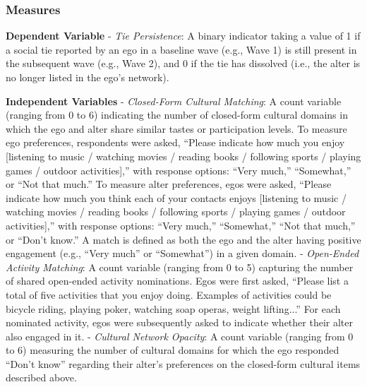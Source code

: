 \subsubsection{Measures}\label{measures}

\textbf{Dependent Variable} - \emph{Tie Persistence}: A binary indicator
taking a value of 1 if a social tie reported by an ego in a baseline
wave (e.g., Wave 1) is still present in the subsequent wave (e.g., Wave
2), and 0 if the tie has dissolved (i.e., the alter is no longer listed
in the ego's network).

\textbf{Independent Variables} - \emph{Closed-Form Cultural Matching}: A
count variable (ranging from 0 to 6) indicating the number of
closed-form cultural domains in which the ego and alter share similar
tastes or participation levels. To measure ego preferences, respondents were asked, ``Please indicate how much you enjoy [listening to music / watching movies / reading books / following sports / playing games / outdoor activities],'' with response options: ``Very much,'' ``Somewhat,'' or ``Not that much.'' To measure alter preferences, egos were asked, ``Please indicate how much you think each of your contacts enjoys [listening to music / watching movies / reading books / following sports / playing games / outdoor activities],'' with response options: ``Very much,'' ``Somewhat,'' ``Not that much,'' or ``Don't know.'' A match is defined as both the ego and the alter having positive engagement (e.g., ``Very much'' or ``Somewhat'') in a given domain. - \emph{Open-Ended
Activity Matching}: A count variable (ranging from 0 to 5) capturing the
number of shared open-ended activity nominations. Egos were first asked, ``Please list a total of five activities that you enjoy doing. Examples of activities could be bicycle riding, playing poker, watching soap operas, weight lifting...'' For each nominated activity, egos were subsequently asked to indicate whether their alter also engaged in it. - \emph{Cultural Network
Opacity}: A count variable (ranging from 0 to 6) measuring the number of
cultural domains for which the ego responded ``Don't know'' regarding
their alter's preferences on the closed-form cultural items described above.

